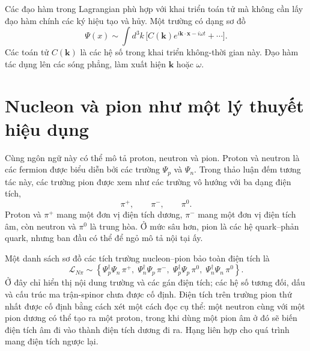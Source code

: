 Các đạo hàm trong Lagrangian phù hợp với khai triển toán tử mà không cần lấy đạo hàm chính các ký hiệu tạo và hủy. Một trường có dạng sơ đồ
\begin{equation}
\Psi(x)
\sim
\int d^3k\,
\bigl[
C(\mathbf k)e^{i\mathbf k\cdot\mathbf x-i\omega t}
+\cdots
\bigr].
\end{equation}
Các toán tử \(C(\mathbf k)\) là các hệ số trong khai triển không-thời gian này. Đạo hàm tác dụng lên các sóng phẳng, làm xuất hiện \(\mathbf k\) hoặc \(\omega\).

\begin{classroomqa}
\end{classroomqa}

\section{Nucleon và pion như một lý thuyết hiệu dụng}

Cùng ngôn ngữ này có thể mô tả proton, neutron và pion. Proton và neutron là các fermion được biểu diễn bởi các trường \(\Psi_p\) và \(\Psi_n\). Trong thảo luận đếm tương tác này, các trường pion được xem như các trường vô hướng với ba dạng điện tích,
\begin{equation}
\pi^+,
\qquad
\pi^-,
\qquad
\pi^0.
\end{equation}
Proton và \(\pi^+\) mang một đơn vị điện tích dương, \(\pi^-\) mang một đơn vị điện tích âm, còn neutron và \(\pi^0\) là trung hòa. Ở mức sâu hơn, pion là các hệ quark--phản quark, nhưng ban đầu có thể để ngỏ mô tả nội tại ấy.

Một danh sách sơ đồ các tích trường nucleon--pion bảo toàn điện tích là
\begin{equation}
\mathcal L_{N\pi}
\sim
\left\{
\Psi_p^\dagger\Psi_n\,\pi^+,\;
\Psi_n^\dagger\Psi_p\,\pi^-,\;
\Psi_p^\dagger\Psi_p\,\pi^0,\;
\Psi_n^\dagger\Psi_n\,\pi^0
\right\}.
\end{equation}
Ở đây chỉ hiển thị nội dung trường và các gán điện tích; các hệ số tương đối, dấu và cấu trúc ma trận-spinor chưa được cố định. Điện tích trên trường pion thứ nhất được cố định bằng cách xét một cách đọc cụ thể: một neutron cùng với một pion dương có thể tạo ra một proton, trong khi dùng một pion âm ở đó sẽ biến điện tích âm đi vào thành điện tích dương đi ra. Hạng liên hợp cho quá trình mang điện tích ngược lại.


